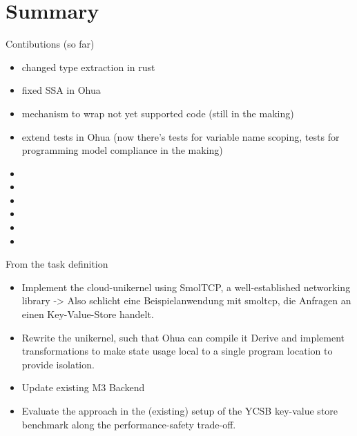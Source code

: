 \section{Summary}

Contibutions (so far)
\begin{itemize}
    \item changed type extraction in rust
    \item fixed SSA in Ohua
    \item mechanism to wrap not yet supported code (still in the making)
    \item extend tests in Ohua (now there's tests for variable name scoping, tests for programming model compliance in the making)
    \item {}
    \item {}
    \item {}
    \item {}
    \item {}
    \item {}
\end{itemize}

From the task definition
\begin{itemize}
    \item Implement the cloud-unikernel using SmolTCP, a well-established networking library -> Also schlicht eine Beispielanwendung mit smoltcp, die Anfragen an einen Key-Value-Store handelt. 
    \item Rewrite the unikernel, such that Ohua can compile it Derive and implement transformations to make state usage local to a single program location to provide isolation.
    \item Update existing M3 Backend
    \item Evaluate the approach in the (existing) setup of the YCSB key-value store benchmark along the performance-safety trade-off. 
\end{itemize}


